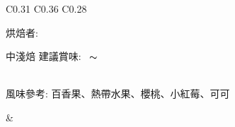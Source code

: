 \documentclass[10pt,a4paper]{article}
\begin{document}
\begin{tabular}{C{0.31\textwidth} C{0.36\textwidth} C{0.28\textwidth}}
{{烘焙者: \textbf{\scriptsize{}}}\vspace*{-0.3em}\\
 \addtocounter{datenumber}{
5 }%
\setdatebynumber{\thedatenumber} 
{\normalsize 
中淺焙%
\enskip \scriptsize 建議賞味:} \scriptsize{\datemonthname ~\thedateday}$\thicksim$\addtocounter{datenumber}{55}\setdatebynumber{\thedatenumber} \datedate
\\\scriptsize 風味參考: 百香果、熱帶水果、櫻桃、小紅莓、可可
}& \shortstack[c]{
%
%
\hspace*{1.3cm} { \vspace*{-0.68cm}\Large 
}}
\end{tabular}
\end{document}
